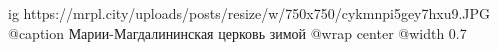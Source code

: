  
 
 
 
 

\ifcmt
  ig https://mrpl.city/uploads/posts/resize/w/750x750/cykmnpi5gey7hxu9.JPG
	@caption Марии-Магдалининская церковь зимой
  @wrap center
  @width 0.7
\fi
